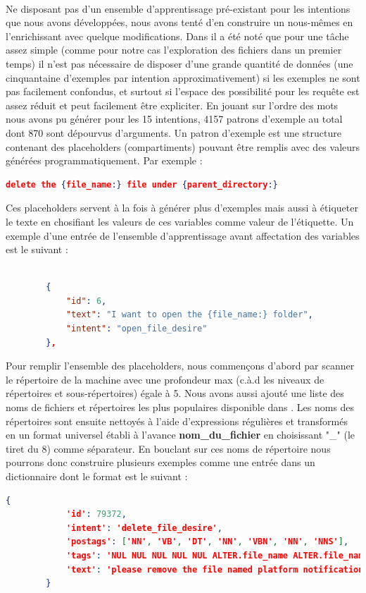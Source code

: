 		\paragraph{}
		\label{nlu_dataset}
		Ne disposant pas d'un ensemble d'apprentissage pré-existant pour les intentions que nous avons développées, nous avons tenté d'en construire un nous-mêmes en l'enrichissant avec quelque modifications. Dans \cite{rasa_nlu} il a été noté que pour une tâche assez simple (comme pour notre cas l'exploration des fichiers dans un premier temps) il n'est pas nécessaire de disposer d'une grande quantité de données (une cinquantaine d'exemples par intention approximativement) si les exemples ne sont pas facilement confondus, et surtout si l'espace des possibilité pour les requête est assez réduit et peut facilement être expliciter. En jouant sur l'ordre des mots nous avons pu générer pour les 15 intentions, 4157 patrons d'exemple au total dont 870 sont dépourvus d'arguments. Un patron d'exemple est une structure contenant des placeholders (compartiments) pouvant être remplis avec des valeurs générées programmatiquement. Par exemple : 
		\begin{lstlisting}[language=json]
		delete the {file_name:} file under {parent_directory:}\end{lstlisting}
		Ces placeholders servent à la fois à générer plus d'exemples mais aussi à étiqueter le texte en chosifiant les valeurs de ces variables comme valeur de l'étiquette. Un exemple d'une entrée de l'ensemble d'apprentissage avant affectation des variables est le suivant : 
		\begin{lstlisting}[language=json]
		
		{
			"id": 6,
			"text": "I want to open the {file_name:} folder",
			"intent": "open_file_desire"
		},
		\end{lstlisting}
		Pour remplir l'ensemble des placeholders, nous commençons d'abord par scanner le répertoire de la machine avec une profondeur max (c.à.d les niveaux de répertoires et sous-répertoires) égale à 5. Nous avons aussi ajouté une liste des noms de fichiers et répertoires les plus populaires disponible dans \cite{most_common}.
		Les noms des répertoires sont ensuite nettoyés à l'aide d'expressions régulières et transformés en un format universel établi à l'avance \textbf{nom\_du\_fichier} en choisissant "\_" (le tiret du 8) comme séparateur. En bouclant sur ces noms de répertoire nous pourrons donc construire plusieurs exemples comme une entrée dans un dictionnaire dont le format est le suivant : 
		\begin{lstlisting}[language=json]
		{
			'id': 79372,
			'intent': 'delete_file_desire',
			'postags': ['NN', 'VB', 'DT', 'NN', 'VBN', 'NN', 'NNS'],
			'tags': 'NUL NUL NUL NUL NUL ALTER.file_name ALTER.file_name',
			'text': 'please remove the file named platform notifications'
		}
		\end{lstlisting}
